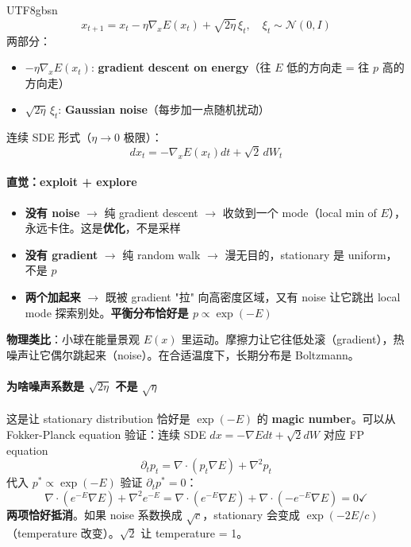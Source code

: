 \documentclass[11pt]{article}
\begin{document}
\begin{CJK}{UTF8}{gbsn}
\[
\boxed{x_{t+1} = x_t - \eta \nabla_x E(x_t) + \sqrt{2 \eta} \, \xi_t, \quad \xi_t \sim \mathcal{N}(0, I)}
\]
两部分：
\begin{itemize}[nosep]
  \item $-\eta \nabla_x E(x_t)$: \textbf{gradient descent on energy}（往 $E$ 低的方向走 = 往 $p$ 高的方向走）
  \item $\sqrt{2\eta}\, \xi_t$: \textbf{Gaussian noise}（每步加一点随机扰动）
\end{itemize}

连续 SDE 形式（$\eta \to 0$ 极限）：
\[
dx_t = -\nabla_x E(x_t) dt + \sqrt{2} \, dW_t
\]

\paragraph{直觉：exploit + explore}

\begin{itemize}[nosep]
  \item \textbf{没有 noise} $\to$ 纯 gradient descent $\to$ 收敛到一个 mode（local min of $E$），永远卡住。这是\textbf{优化}，不是采样
  \item \textbf{没有 gradient} $\to$ 纯 random walk $\to$ 漫无目的，stationary 是 uniform，不是 $p$
  \item \textbf{两个加起来} $\to$ 既被 gradient "拉" 向高密度区域，又有 noise 让它跳出 local mode 探索别处。\textbf{平衡分布恰好是 $p \propto \exp(-E)$}
\end{itemize}

\textbf{物理类比}：小球在能量景观 $E(x)$ 里运动。摩擦力让它往低处滚（gradient），热噪声让它偶尔跳起来（noise）。在合适温度下，长期分布是 Boltzmann。

\paragraph{为啥噪声系数是 $\sqrt{2\eta}$ 不是 $\sqrt{\eta}$}

这是让 stationary distribution 恰好是 $\exp(-E)$ 的 \textbf{magic number}。可以从 Fokker-Planck equation 验证：连续 SDE $dx = -\nabla E dt + \sqrt{2} dW$ 对应 FP equation
\[
\partial_t p_t = \nabla \cdot (p_t \nabla E) + \nabla^2 p_t
\]
代入 $p^* \propto \exp(-E)$ 验证 $\partial_t p^* = 0$：
\[
\nabla \cdot (e^{-E} \nabla E) + \nabla^2 e^{-E} = \nabla \cdot (e^{-E} \nabla E) + \nabla \cdot (-e^{-E} \nabla E) = 0 \checkmark
\]
\textbf{两项恰好抵消}。如果 noise 系数换成 $\sqrt{c}$，stationary 会变成 $\exp(-2E/c)$（temperature 改变）。$\sqrt{2}$ 让 temperature = 1。


\end{CJK}
\end{document}
